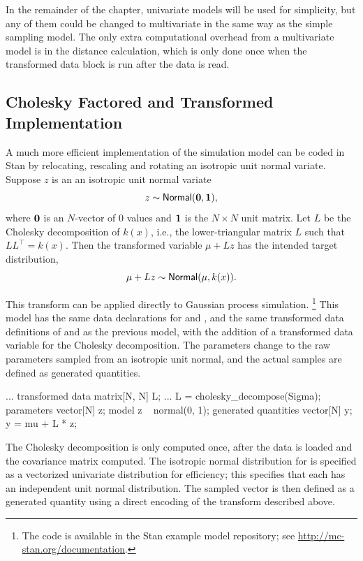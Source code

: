 In the remainder of the chapter, univariate models will be used for
simplicity, but any of them could be changed to multivariate in the
same way as the simple sampling model.  The only extra computational
overhead from a multivariate model is in the distance calculation,
which is only done once when the transformed data block is run after
the data is read.

\subsection{Cholesky Factored and Transformed Implementation}

A much more efficient implementation of the simulation model can be
coded in Stan by relocating, rescaling and rotating an isotropic unit
normal variate.  Suppose $z$ is an an isotropic unit normal variate
\[
z \sim \distro{Normal}({\bf 0}, {\bf 1}),
\]
where ${\bf 0}$ is an $N$-vector of 0 values and ${\bf 1}$ is the $N
\times N$ unit matrix.  Let $L$ be the Cholesky decomposition of
$k(x)$, i.e., the lower-triangular matrix $L$ such that $LL^{\top} =
k(x)$.  Then the transformed variable $\mu + Lz$ has the intended
target distribution,
\[
\mu + Lz \sim \distro{Normal}(\mu, k(x)).
\]

This transform can be applied directly to Gaussian process
simulation.%
%
\footnote{The code is available in the Stan example model repository;
see \url{http://mc-stan.org/documentation}.}
%
This model has the same data declarations for  and ,
and the same transformed data definitions of  and
 as the previous model, with the addition of a transformed
data variable for the Cholesky decomposition.  The parameters change
to the raw parameters sampled from an isotropic unit normal, and the
actual samples are defined as generated quantities.
%
\begin{stancode}
...
transformed data {
  matrix[N, N] L;
...
  L = cholesky_decompose(Sigma);
}
parameters {
  vector[N] z;
}
model {
  z ~ normal(0, 1);
}
generated quantities {
  vector[N] y;
  y = mu + L * z;
}
\end{stancode}
%
The Cholesky decomposition is only computed once, after the data is
loaded and the covariance matrix  computed.  The isotropic
normal distribution for  is specified as a vectorized
univariate distribution for efficiency; this specifies that each
 has an independent unit normal distribution.  The sampled
vector  is then defined as a generated quantity using a direct
encoding of the transform described above.


